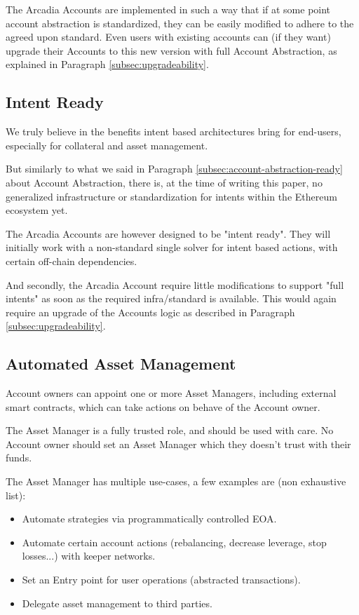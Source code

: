 \documentclass[sigconf,nonacm]{acmart}
\begin{document}
The Arcadia Accounts are implemented in such a way that if at some point account abstraction is standardized, they can be easily modified to adhere to the agreed upon standard.
Even users with existing accounts can (if they want) upgrade their Accounts to this new version with full Account Abstraction, as explained in Paragraph \ref{subsec:upgradeability}.

\subsection{Intent Ready}
We truly believe in the benefits intent based architectures bring for end-users,
especially for collateral and asset management.

But similarly to what we said in Paragraph \ref{subsec:account-abstraction-ready} about Account Abstraction,
there is, at the time of writing this paper, no generalized infrastructure or standardization for intents within the Ethereum ecosystem yet.

The Arcadia Accounts are however designed to be "intent ready".
They will initially work with a non-standard single solver for intent based actions, with certain off-chain dependencies.

And secondly, the Arcadia Account require little modifications to support "full intents" as soon as the required infra/standard is available.
This would again require an upgrade of the Accounts logic as described in Paragraph \ref{subsec:upgradeability}.

\subsection{Automated Asset Management}
Account owners can appoint one or more Asset Managers, including external smart contracts, which can take actions on behave of the Account owner.

The Asset Manager is a fully trusted role, and should be used with care.
No Account owner should set an Asset Manager which they doesn't trust with their funds.

The Asset Manager has multiple use-cases, a few examples are (non exhaustive list):
\begin{itemize}
    \item Automate strategies via programmatically controlled EOA.
    \item Automate certain account actions (rebalancing, decrease leverage, stop losses...) with keeper networks.
    \item Set an Entry point for user operations (abstracted transactions).
    \item Delegate asset management to third parties.
\end{itemize}
\end{document}
